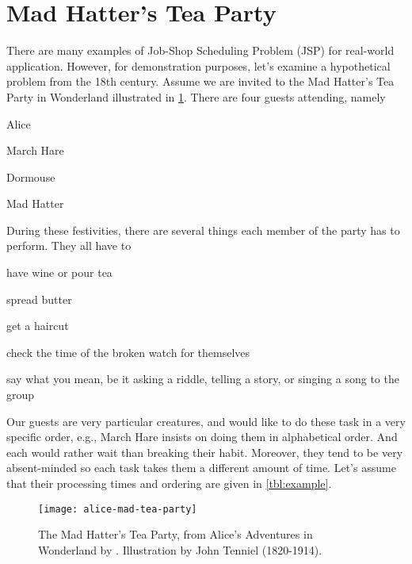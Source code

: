 \section{Mad Hatter's Tea Party}
There are many examples of Job-Shop Scheduling Problem (JSP) for real-world 
application. 
However, for demonstration purposes, let's examine a hypothetical problem from 
the 18th century. 
Assume we are invited to the Mad Hatter's Tea Party in Wonderland 
illustrated in \cref{fig:teaparty}. 
There are four guests attending, namely
\begin{enumerate*}[label={$J_\arabic*$)}, ref={{$J_\arabic*$}}, 
    itemjoin*={{, and of course our host }}]
    \item Alice\label{guest:alice}
    \item March Hare\label{guest:marchhare}
    \item Dormouse\label{guest:dormouse}
    \item Mad Hatter\label{guest:madhatter}
\end{enumerate*}
During these festivities, there are several things each member of the party 
has to perform. They all have to
\begin{enumerate*}[label={$M_\arabic*$)}]
    \item have wine or pour tea
    \item spread butter
    \item get a haircut
    \item check the time of the broken watch for themselves
    \item say what you mean, be it asking a riddle, telling a story, or singing 
    a song to the group
\end{enumerate*}
Our guests are very particular creatures, and would like to do these task in a 
very specific order, e.g., March Hare insists on doing 
them in alphabetical order. And each would rather wait than breaking their 
habit.
Moreover, they tend to be very absent-minded so each task takes them a 
different amount of time. 
Let's assume that their processing times and ordering are given in 
\cref{tbl:example}. 

\begin{figure}[b!]\centering 
    \texttt{[image: alice-mad-tea-party]}
    \caption[Short figure name.]{The Mad Hatter's Tea Party, from Alice's 
    Adventures in Wonderland by \citet{alice}. 
    Illustration by John Tenniel (1820-1914).}\label{fig:teaparty}
\end{figure}

